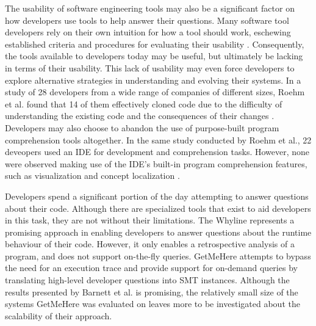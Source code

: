 \par The usability of software engineering tools may also be a significant
factor on how developers use tools to help answer their questions.
Many software tool developers rely on their own intuition for how a tool should
work, eschewing established criteria and procedures for evaluating their 
usability \cite{toleman-98-soft-tools}.
Consequently, the tools available to developers today may be useful, but
ultimately be lacking in terms of their usability.
This lack of usability may even force developers to explore alternative
strategies in understanding and evolving their systems.
In a study of 28 developers from a wide range of companies of different sizes,
Roehm et al. found that 14 of them effectively cloned code due to the
difficulty of understanding the existing code and the consequences of their
changes \cite{roehm-2012-comprehend-software}.
Developers may also choose to abandon the use of purpose-built program
comprehension tools altogether.
In the same study conducted by Roehm et al., 22 deveopers used an IDE
for development and comprehension tasks.
However, none were observed making use of the IDE's built-in program 
comprehension features, such as visualization and concept localization
\cite{roehm-2012-comprehend-software}.

\par Developers spend a significant portion of the day attempting to answer
questions about their code.
Although there are specialized tools that exist to aid developers in this task,
they are not without their limitations. 
The Whyline represents a promising approach in enabling developers to answer 
questions about the runtime behaviour of their code.
However, it only enables a retrospective analysis of a program, and does not 
support on-the-fly queries.
GetMeHere attempts to bypass the need for an execution trace and provide support
for on-demand queries by translating high-level developer questions into SMT
instances. 
Although the results presented by Barnett et al. is promising, the
relatively small size of the systems GetMeHere was evaluated on leaves more to
be investigated about the scalability of their approach.

\endinput

TODO: add a paragraph about what my thesis attempts to contribute (in relation
to the related work section).

